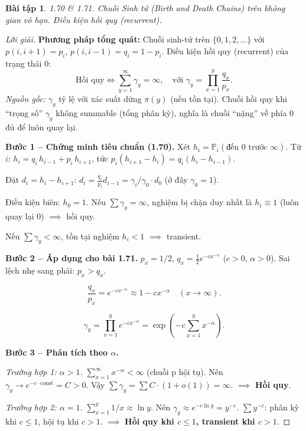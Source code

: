 \documentclass[8pt,a4paper]{article}
\newtheorem{exercise}{Bài tập}
\newenvironment{solution}{\begin{proof}[Lời giải]}{\end{proof}}
\newcommand{\prob}{\mathbb{P}}
\begin{document}
\begin{exercise}
1.70 \& 1.71. Chuỗi Sinh tử (Birth and Death Chains) trên không gian vô hạn. Điều kiện hồi quy (recurrent).
\end{exercise}
\begin{solution}
\textbf{Phương pháp tổng quát:} Chuỗi sinh-tử trên $\{0, 1, 2, \ldots\}$ với $p(i, i+1) = p_i$, $p(i, i-1) = q_i = 1-p_i$. Điều kiện hồi quy (recurrent) của trạng thái 0:
\[
  \text{Hồi quy} \iff \sum_{y=1}^{\infty} \gamma_y = \infty, \quad \text{với } \gamma_y = \prod_{x=1}^{y} \frac{q_x}{p_x}.
\]
\textit{Nguồn gốc:} $\gamma_y$ tỷ lệ với xác suất dừng $\pi(y)$ (nếu tồn tại). Chuỗi hồi quy khi ``trọng số'' $\gamma_y$ không summable (tổng phân kỳ), nghĩa là chuỗi ``nặng'' về phía 0 đủ để luôn quay lại.

\textbf{Bước 1 -- Chứng minh tiêu chuẩn (1.70).}
Xét $h_i = \prob_i(\text{đến 0 trước } \infty)$. Từ $i$: $h_i = q_i\, h_{i-1} + p_i\, h_{i+1}$, tức $p_i(h_{i+1} - h_i) = q_i(h_i - h_{i-1})$.

Đặt $d_i = h_i - h_{i+1}$: $d_i = \frac{q_i}{p_i} d_{i-1} = \gamma_i / \gamma_0 \cdot d_0$ (ở đây $\gamma_0 = 1$).

Điều kiện biên: $h_0 = 1$. Nếu $\sum \gamma_y = \infty$, nghiệm bị chặn duy nhất là $h_i \equiv 1$ (luôn quay lại 0) $\implies$ hồi quy.

Nếu $\sum \gamma_y < \infty$, tồn tại nghiệm $h_i < 1$ $\implies$ transient.

\textbf{Bước 2 -- Áp dụng cho bài 1.71.}
$p_x = 1/2$, $q_x = \frac{1}{2} e^{-c x^{-\alpha}}$ ($c > 0$, $\alpha > 0$). Sai lệch nhẹ sang phải: $p_x > q_x$.

\[
  \frac{q_x}{p_x} = e^{-c x^{-\alpha}} \approx 1 - c x^{-\alpha} \quad (x \to \infty).
\]

\[
  \gamma_y = \prod_{x=1}^{y} e^{-c x^{-\alpha}} = \exp\left(-c \sum_{x=1}^{y} x^{-\alpha}\right).
\]

\textbf{Bước 3 -- Phân tích theo $\alpha$.}

\textit{Trường hợp 1: $\alpha > 1$.} $\sum_{x=1}^{\infty} x^{-\alpha} < \infty$ (chuỗi p hội tụ). Nên $\gamma_y \to e^{-c \cdot \text{const}} = C > 0$. Vậy $\sum \gamma_y = \sum C \cdot (1 + o(1)) = \infty$. $\implies$ \textbf{Hồi quy}.

\textit{Trường hợp 2: $\alpha = 1$.} $\sum_{x=1}^{y} 1/x \approx \ln y$. Nên $\gamma_y \approx e^{-c \ln y} = y^{-c}$. $\sum y^{-c}$: phân kỳ khi $c \leq 1$, hội tụ khi $c > 1$. $\implies$ \textbf{Hồi quy khi $c \leq 1$, transient khi $c > 1$}.


\end{solution}
\end{document}
